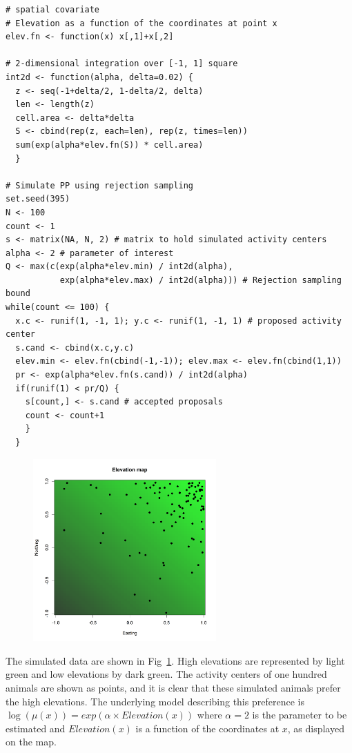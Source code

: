 \begin{small}
\begin{verbatim}
# spatial covariate
# Elevation as a function of the coordinates at point x
elev.fn <- function(x) x[,1]+x[,2]

# 2-dimensional integration over [-1, 1] square
int2d <- function(alpha, delta=0.02) {
  z <- seq(-1+delta/2, 1-delta/2, delta)
  len <- length(z)
  cell.area <- delta*delta
  S <- cbind(rep(z, each=len), rep(z, times=len))
  sum(exp(alpha*elev.fn(S)) * cell.area)
  }

# Simulate PP using rejection sampling
set.seed(395)
N <- 100
count <- 1
s <- matrix(NA, N, 2) # matrix to hold simulated activity centers
alpha <- 2 # parameter of interest
Q <- max(c(exp(alpha*elev.min) / int2d(alpha),
           exp(alpha*elev.max) / int2d(alpha))) # Rejection sampling bound
while(count <= 100) {
  x.c <- runif(1, -1, 1); y.c <- runif(1, -1, 1) # proposed activity center
  s.cand <- cbind(x.c,y.c)
  elev.min <- elev.fn(cbind(-1,-1)); elev.max <- elev.fn(cbind(1,1))
  pr <- exp(alpha*elev.fn(s.cand)) / int2d(alpha)
  if(runif(1) < pr/Q) {
    s[count,] <- s.cand # accepted proposals
    count <- count+1
    }
  }
\end{verbatim}
\end{small}


\begin{figure}
\centering
\includegraphics[width=7cm,height=7cm]{figs/elevMap}
\label{fig:elevMap}
\end{figure}

The simulated data are shown in Fig~\ref{fig:elevMap}. High elevations
are represented by light green and low elevations by dark green. The
activity centers of one hundred animals are shown as
points, and it is clear that these simulated animals prefer the high
elevations.  The underlying model describing this preference is
$\log(\mu(x)) = exp(\alpha \times Elevation(x))$
where $\alpha=2$ is the parameter to be estimated and $Elevation(x)$
is a function of the coordinates at $x$, as displayed on the map.

